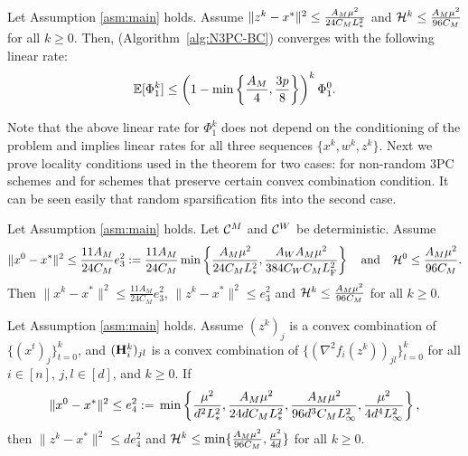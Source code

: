 \documentclass[11pt]{article}
\begin{document}
	\begin{theorem}\label{th:3PCBL1}
		Let Assumption \ref{asm:main} holds. Assume $\|z^k-x^*\|^2 \leq \frac{A_M \mu^2}{24C_M L_{*}^2}$ and ${\mathcal{H}}^k \leq \frac{A_M \mu^2}{96C_M}$ for all $k\geq 0$. Then,  (Algorithm~\ref{alg:N3PC-BC}) converges with the following linear rate:
		\begin{equation}\label{rate:local-linear-BC}
			\squeeze
			\mathbb{E}[\Phi_1^k] \leq \left(  1 - \min\left\{  \frac{A_{M}}{4}, \frac{3p}{8}  \right\}  \right)^k \Phi_1^0.
		\end{equation}
	\end{theorem}
	
	Note that the above linear rate for $\Phi_1^k$ does not depend on the conditioning of the problem and implies linear rates for all three sequences $\{x^k,w^k,z^k\}$. Next we prove locality conditions used in the theorem for two cases: for non-random 3PC schemes and for schemes that preserve certain convex combination condition. It can be seen easily that random sparsification fits into the second case.
	
	
	\begin{lemma}[Deterministic 3PC]\label{lm:nbor-N3PCBC-det}
		Let Assumption \ref{asm:main} holds. Let ${\mathcal{C}}^M$ and ${\mathcal{C}}^W$ be deterministic. Assume $$\|x^0 - x^*\|^2 \leq \frac{11A_M}{24C_M} e_3^2 \; { := }\; \frac{11A_M}{24C_M}\min\left\{  \frac{A_M \mu^2}{24C_M L_{*}^2}, \frac{A_WA_M \mu^2}{384C_WC_ML_{\rm F}^2}  \right\} \quad\text{and}\quad {\mathcal{H}}^0 \leq \frac{A_M \mu^2}{96C_M}.$$ Then $\|x^k-x^*\|^2 \leq \frac{11A_M}{24C_M} e_3^2$, $\|z^k - x^*\|^2 \leq e_3^2$ and ${\mathcal{H}}^k \leq  \frac{A_M \mu^2}{96C_M}$ for all $k\geq 0$.
	\end{lemma}
	\begin{lemma}\label{lm:nbor-N3PCBC-conv}
		Let Assumption \ref{asm:main} holds. Assume $(z^k)_j$ is a convex combination of $\{(x^t)_j\}_{t=0}^k$, and $(\mathbf{H}_i^k)_{jl}$ is a convex combination of $\{  (\nabla^2 f_i(z^k))_{jl}  \}_{t=0}^k$ for all $i\in [n]$, $j,l \in [d]$, and $k\geq 0$. If $$\|x^0-x^*\|^2 \leq e_4^2 \; { := }\; \min\left\{ \frac{\mu^2}{d^2 L_{*}^2}, \frac{A_M \mu^2}{24d C_M L_{*}^2}, \frac{A_M\mu^2}{96d^3 C_M L_{\infty}^2}, \frac{\mu^2}{4d^4 L_{\infty}^2} \right\},$$ then $\|z^k-x^*\|^2 \leq d e_4^2$ and ${\mathcal{H}}^k \leq \min \{  \frac{A_M\mu^2}{96C_M}, \frac{\mu^2}{4d}  \}$ for all $k\geq 0$. 
	\end{lemma}
	
	
\end{document}
